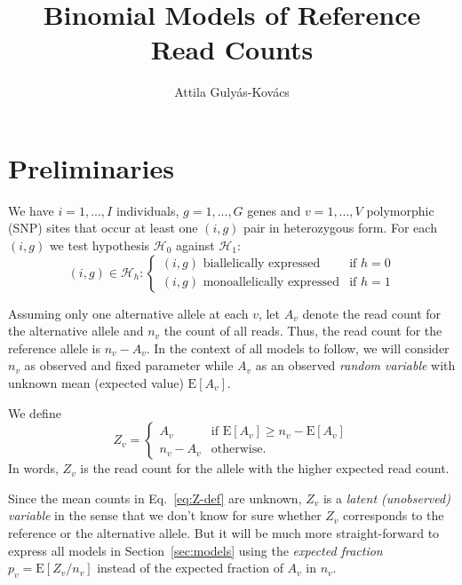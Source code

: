 \documentclass[letterpaper]{article}
\title{Binomial Models of Reference Read Counts}
\author{Attila Gulyás-Kovács}
\begin{document}
\maketitle

\section{Preliminaries}

We have \(i=1,...,I\) individuals, \(g=1,...,G\) genes and \(v=1,...,V\)
polymorphic (SNP) sites that occur at least one \((i,g)\) pair in heterozygous form.  For
each \((i,g)\) we test hypothesis \(\mathcal{H}_0\) against \(\mathcal{H}_1\):
\begin{equation}
(i,g) \in \mathcal{H}_h :
\begin{cases}
(i,g) \text{ biallelically expressed} & \text{if } h=0 \\
(i,g) \text{ monoallelically expressed} & \text{if } h=1
\end{cases}
\end{equation}

Assuming only one alternative allele at each \(v\), let \(A_v\) denote the
read count for the alternative allele and \(n_v\) the count of all reads.
Thus, the read count for the reference allele is \(n_v-A_v\). In the context
of all models to follow, we will consider \(n_v\) as observed and fixed
parameter while \(A_v\) as an observed \emph{random variable} with unknown
mean (expected value) \(\mathrm{E}[A_v]\).  

We define
\begin{equation}
\label{eq:Z-def}
Z_v =
\begin{cases}
A_v & \text{if } \mathrm{E}[A_v] \ge n_v-\mathrm{E}[A_v] \\
n_v-A_v & \text{otherwise}.
\end{cases}
\end{equation}
In words, \(Z_v\) is the read count for the allele with the higher expected
read count.

Since the mean counts in Eq.~\ref{eq:Z-def} are unknown, \(Z_v\) is a
\emph{latent (unobserved) variable} in the sense that we don't know for sure whether \(Z_v\) corresponds
to the reference or the alternative allele.  But it will be much more
straight-forward to express all models in Section~\ref{sec:models} using the
\emph{expected fraction} \(p_v=\mathrm{E}[Z_v/n_v]\) instead of the expected fraction
of \(A_v\) in \(n_v\).
\end{document}
